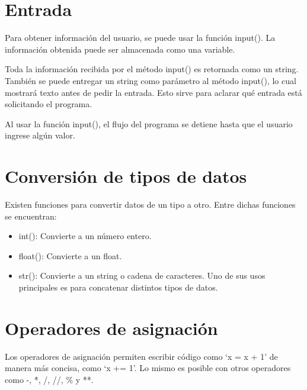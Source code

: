 \documentclass{report}
\newcommand{\simple}[1]{`#1'}
\begin{document}
\section{Entrada}

Para obtener información del usuario, se puede usar la función input(). La información obtenida puede ser almacenada como una variable.


Toda la información recibida por el método input() es retornada como un string.
También se puede entregar un string como parámetro al método input(), lo cual mostrará texto antes de pedir la entrada. Esto sirve para aclarar qué entrada está solicitando el programa.


Al usar la función input(), el flujo del programa se detiene hasta que el usuario ingrese algún valor.

\section{Conversión de tipos de datos}

Existen funciones para convertir datos de un tipo a otro. Entre dichas funciones se encuentran:

\begin{itemize}
  \item int(): Convierte a un número entero.
  

  \item float(): Convierte a un float.
  

  \item str(): Convierte a un string o cadena de caracteres. Uno de sus usos principales es para concatenar distintos tipos de datos.


\end{itemize}

\section{Operadores de asignación}

Los operadores de asignación permiten escribir código como \simple{x = x + 1} de manera más concisa, como \simple{x += 1}. Lo mismo es posible con otros operadores como -, *, /, //, \% y **.
\end{document}
